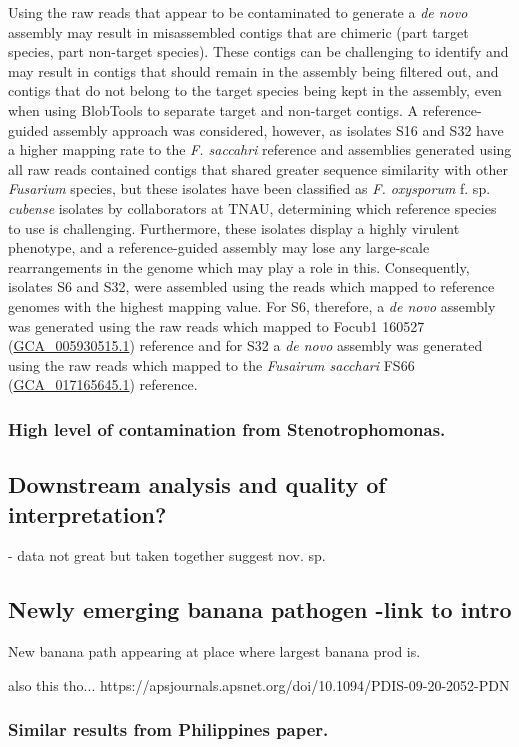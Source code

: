 Using the raw reads that appear to be contaminated to generate a \textit{de novo} assembly may result in misassembled contigs that are chimeric (part target species, part non-target species). These contigs can be challenging to identify and may result in contigs that should remain in the assembly being filtered out, and contigs that do not belong to the target species being kept in the assembly, even when using BlobTools to separate target and non-target contigs. A reference-guided assembly approach was considered, however, as isolates S16 and S32 have a higher mapping rate to the \textit{F. saccahri} reference and assemblies generated using all raw reads contained contigs that shared greater sequence similarity with other \textit{Fusarium} species, but these isolates have been classified as \textit{F. oxysporum} f. sp. \textit{cubense} isolates by collaborators at TNAU, determining which reference species to use is challenging. Furthermore, these isolates display a highly virulent phenotype, and a reference-guided assembly may lose any large-scale rearrangements in the genome which may play a role in this. Consequently, isolates S6 and S32, were assembled using the reads which mapped to reference genomes with the highest mapping value. For S6, therefore, a \textit{de novo} assembly was generated using the raw reads which mapped to \ac{Focub1} 160527 (\href{https://www.ncbi.nlm.nih.gov/datasets/genome/GCA_005930515.1/}{GCA\_005930515.1}) reference and for S32 a \textit{de novo} assembly was generated using the raw reads which mapped to
the \textit{Fusairum sacchari} FS66 (\href{https://www.ncbi.nlm.nih.gov/datasets/genome/GCA_017165645.1/}{GCA\_017165645.1}) reference.  

\subsubsection{High level of contamination from Stenotrophomonas.}
\subsection{Downstream analysis and quality of interpretation?}
- data not great but taken together suggest nov. sp. 
\subsection{Newly emerging banana pathogen -link to intro}
New banana path appearing at place where largest banana prod is. 

also this tho... https://apsjournals.apsnet.org/doi/10.1094/PDIS-09-20-2052-PDN 
\subsubsection{Similar results from Philippines paper.}


